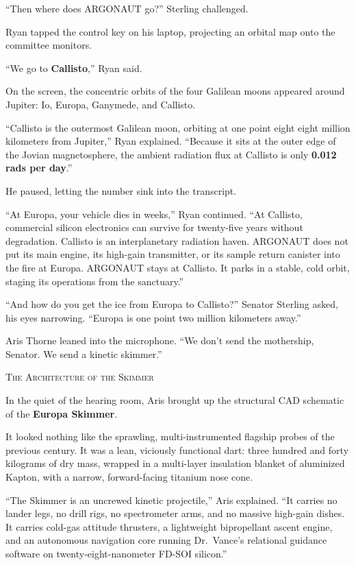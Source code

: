 \documentclass[12pt,twoside,openright]{book}
\newcommand{\sceneheader}[1]{%
  \par\vspace{1.8em}%
  {\noindent\centering\scshape\large #1\par}%
  \vspace{1.0em}%
  \noindent%
}
\newcommand{\dinkus}{%
  \par\vspace{1.2em}%
  {\noindent\centering{\large $\ast\quad\ast\quad\ast$}\par}%
  \vspace{1.2em}%
  \noindent%
}
\begin{document}
``Then where does ARGONAUT go?'' Sterling challenged.

Ryan tapped the control key on his laptop, projecting an orbital map
onto the committee monitors.

``We go to \textbf{Callisto},'' Ryan said.

On the screen, the concentric orbits of the four Galilean moons appeared
around Jupiter: Io, Europa, Ganymede, and Callisto.

``Callisto is the outermost Galilean moon, orbiting at one point eight
eight million kilometers from Jupiter,'' Ryan explained. ``Because it
sits at the outer edge of the Jovian magnetosphere, the ambient
radiation flux at Callisto is only \textbf{0.012 rads per day}.''

He paused, letting the number sink into the transcript.

``At Europa, your vehicle dies in weeks,'' Ryan continued. ``At
Callisto, commercial silicon electronics can survive for twenty-five
years without degradation. Callisto is an interplanetary radiation
haven. ARGONAUT does not put its main engine, its high-gain transmitter,
or its sample return canister into the fire at Europa. ARGONAUT stays at
Callisto. It parks in a stable, cold orbit, staging its operations from
the sanctuary.''

``And how do you get the ice from Europa to Callisto?'' Senator Sterling
asked, his eyes narrowing. ``Europa is one point two million kilometers
away.''

Aris Thorne leaned into the microphone. ``We don't send the mothership,
Senator. We send a kinetic skimmer.''

\dinkus

\sceneheader{The Architecture of the
Skimmer}

In the quiet of the hearing room, Aris brought up the structural CAD
schematic of the \textbf{Europa Skimmer}.

It looked nothing like the sprawling, multi-instrumented flagship probes
of the previous century. It was a lean, viciously functional dart: three
hundred and forty kilograms of dry mass, wrapped in a multi-layer
insulation blanket of aluminized Kapton, with a narrow, forward-facing
titanium nose cone.

``The Skimmer is an uncrewed kinetic projectile,'' Aris explained. ``It
carries no lander legs, no drill rigs, no spectrometer arms, and no
massive high-gain dishes. It carries cold-gas attitude thrusters, a
lightweight bipropellant ascent engine, and an autonomous navigation
core running Dr.~Vance's relational guidance software on
twenty-eight-nanometer FD-SOI silicon.''
\end{document}
